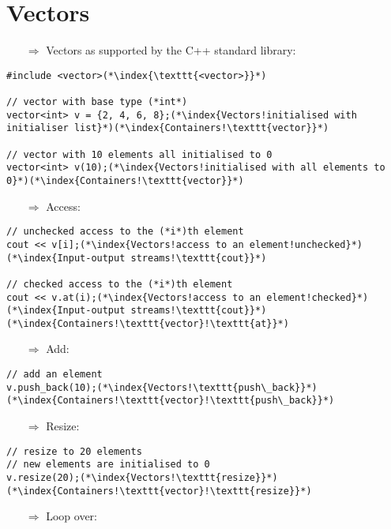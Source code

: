 \documentclass[10pt]{article}
\begin{document}
\section{Vectors}
\small
\begin{enumerate}
\item[$\Rightarrow$] Vectors as supported by the C++ standard library:
\end{enumerate}
\begin{lstlisting}
#include <vector>(*\index{\texttt{<vector>}}*)

// vector with base type (*int*)
vector<int> v = {2, 4, 6, 8};(*\index{Vectors!initialised with initialiser list}*)(*\index{Containers!\texttt{vector}}*)

// vector with 10 elements all initialised to 0
vector<int> v(10);(*\index{Vectors!initialised with all elements to 0}*)(*\index{Containers!\texttt{vector}}*)
\end{lstlisting}
\begin{enumerate}
\item[$\Rightarrow$] Access:
\end{enumerate}
\begin{lstlisting}
// unchecked access to the (*i*)th element
cout << v[i];(*\index{Vectors!access to an element!unchecked}*)(*\index{Input-output streams!\texttt{cout}}*)

// checked access to the (*i*)th element
cout << v.at(i);(*\index{Vectors!access to an element!checked}*)(*\index{Input-output streams!\texttt{cout}}*)(*\index{Containers!\texttt{vector}!\texttt{at}}*)
\end{lstlisting}
\begin{enumerate}
\item[$\Rightarrow$] Add:
\end{enumerate}
\begin{lstlisting}
// add an element
v.push_back(10);(*\index{Vectors!\texttt{push\_back}}*)(*\index{Containers!\texttt{vector}!\texttt{push\_back}}*)
\end{lstlisting}
\begin{enumerate}
\item[$\Rightarrow$] Resize:
\end{enumerate}
\begin{lstlisting}
// resize to 20 elements
// new elements are initialised to 0
v.resize(20);(*\index{Vectors!\texttt{resize}}*)(*\index{Containers!\texttt{vector}!\texttt{resize}}*)
\end{lstlisting}
\begin{enumerate}
\item[$\Rightarrow$] Loop over:
\end{enumerate}
\end{document}
